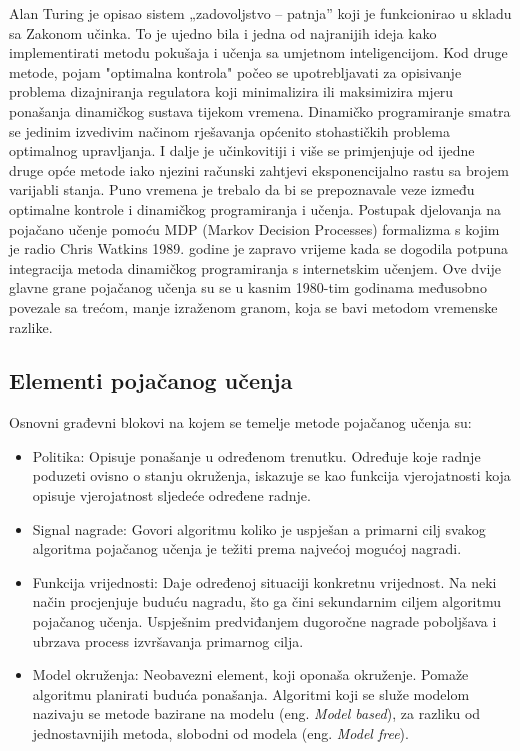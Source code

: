 Alan Turing je opisao sistem „zadovoljstvo – patnja” koji je funkcionirao u skladu sa Zakonom učinka. To je ujedno bila i jedna od najranijih ideja kako implementirati metodu pokušaja i učenja sa umjetnom inteligencijom. Kod druge metode, pojam "optimalna kontrola" počeo se upotrebljavati za opisivanje problema dizajniranja regulatora koji minimalizira ili maksimizira mjeru ponašanja dinamičkog sustava tijekom vremena. Dinamičko programiranje smatra se jedinim izvedivim načinom rješavanja općenito stohastičkih problema optimalnog upravljanja. I dalje je učinkovitiji i više se primjenjuje od ijedne druge opće metode iako njezini računski zahtjevi eksponencijalno rastu sa brojem varijabli stanja. Puno vremena je trebalo da bi se prepoznavale veze između optimalne kontrole i dinamičkog programiranja i učenja. Postupak djelovanja na pojačano učenje pomoću MDP (Markov Decision Processes) formalizma s kojim je radio Chris Watkins 1989. godine je zapravo vrijeme kada se dogodila potpuna integracija metoda dinamičkog programiranja s internetskim učenjem.
Ove dvije glavne grane pojačanog učenja su se u kasnim 1980-tim godinama međusobno povezale sa trećom, manje izraženom granom, koja se bavi metodom vremenske razlike.

\subsection{Elementi pojačanog učenja}
Osnovni građevni blokovi na kojem se temelje metode pojačanog učenja su:
\begin{itemize}
	\item Politika: Opisuje ponašanje u određenom trenutku. Određuje koje radnje poduzeti ovisno o stanju okruženja, iskazuje se kao funkcija vjerojatnosti koja opisuje vjerojatnost sljedeće određene radnje.
	
	\item Signal nagrade: Govori algoritmu koliko je uspješan a primarni cilj svakog algoritma pojačanog učenja je težiti prema najvećoj mogućoj nagradi. 
	
	\item Funkcija vrijednosti: Daje određenoj situaciji konkretnu vrijednost. Na neki način procjenjuje buduću nagradu, što ga čini sekundarnim ciljem algoritmu pojačanog učenja. Uspješnim predviđanjem dugoročne nagrade poboljšava i ubrzava process izvršavanja primarnog cilja. 
	
	\item Model okruženja: Neobavezni element, koji oponaša okruženje. Pomaže algoritmu planirati buduća ponašanja. Algoritmi koji se služe modelom nazivaju se metode bazirane na modelu (eng. \textit{Model based}), za razliku od jednostavnijih metoda, slobodni od modela (eng. \textit{Model free}).
\end{itemize}

